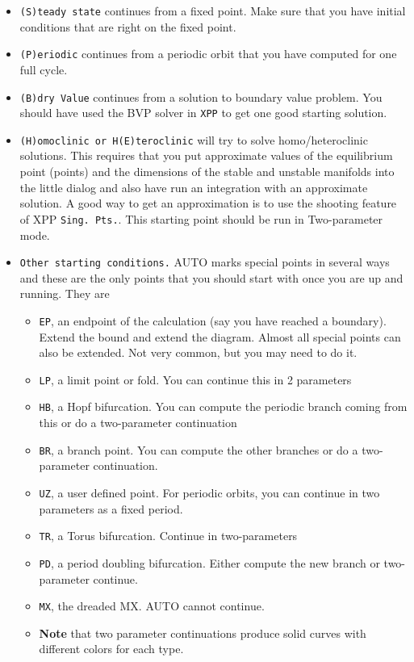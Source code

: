 \documentclass{article}
\begin{document}
\begin{itemize}
\begin{itemize}
\item {\tt (S)teady state} continues from a fixed point. Make sure that you have initial conditions that are right on the fixed point.
\item {\tt (P)eriodic} continues from a periodic orbit that you have computed for one full cycle.
\item {\tt (B)dry Value} continues from a solution to  boundary value problem. You should have used the BVP solver in {\tt XPP} to get one good starting solution.
\item {\tt (H)omoclinic or H(E)teroclinic} will try to solve homo/heteroclinic solutions. This requires that you put approximate values of the equilibrium point (points) and the dimensions of the stable and unstable manifolds into the little dialog and also have run an integration with an approximate solution. A good way to get an approximation is to use the shooting feature of XPP {\tt Sing. Pts.}. 
This starting point should be run in Two-parameter mode.
\item{\tt Other starting conditions.}  AUTO marks special points in several ways and these are the only points that you should start with once you are up and running. They are
\begin{itemize}
\item {\tt EP}, an endpoint of the calculation (say you have reached a boundary). Extend the bound and extend the diagram. Almost all special points can also be extended. Not very common, but you may need to do it.
\item {\tt LP}, a limit point or fold. You can continue this in 2 parameters
\item {\tt HB}, a Hopf bifurcation. You can compute the periodic branch coming from this or do a two-parameter continuation
\item {\tt BR}, a branch point. You can compute the other branches or do a two-parameter continuation.
\item {\tt UZ}, a user defined point. For periodic orbits, you can continue in two parameters as a fixed period.
\item {\tt TR}, a Torus bifurcation. Continue in two-parameters
\item {\tt PD}, a period doubling bifurcation. Either compute the new branch or two-parameter continue.
\item {\tt MX}, the dreaded MX. AUTO cannot continue. 
\item {\bf Note} that two parameter continuations produce solid curves with different colors for each type.
\end{itemize} 
\end{itemize} 



\end{itemize}
\end{document}
